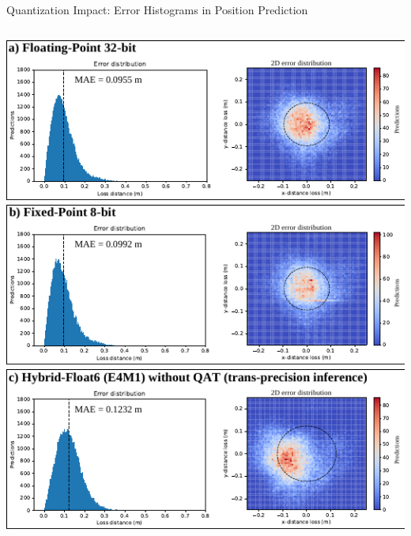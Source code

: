 \begin{frame}{Quantization Impact: Error Histograms in Position Prediction}
	\begin{columns}[T] %
		\begin{column}{0.5\textwidth}
			\centering
			\includegraphics[width=0.95\linewidth]{slides/figures/model_evaluation_a.pdf} %
			\pause %
			\includegraphics[width=0.95\linewidth]{slides/figures/model_evaluation_b.pdf} %
			\pause %
			\includegraphics[width=0.95\linewidth]{slides/figures/model_evaluation_c.pdf} %
			\pause %
		\end{column}
		

\end{columns}
\end{frame}
